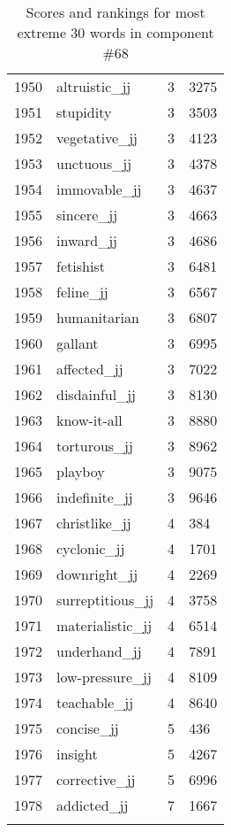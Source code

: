 \begin{longtable}[!htbp]{| rlr@{.}l |}
    1950 & altruistic\_jj & 3 & 3275 \\
    1951 & stupidity & 3 & 3503 \\
    1952 & vegetative\_jj & 3 & 4123 \\
    1953 & unctuous\_jj & 3 & 4378 \\
    1954 & immovable\_jj & 3 & 4637 \\
    1955 & sincere\_jj & 3 & 4663 \\
    1956 & inward\_jj & 3 & 4686 \\
    1957 & fetishist & 3 & 6481 \\
    1958 & feline\_jj & 3 & 6567 \\
    1959 & humanitarian & 3 & 6807 \\
    1960 & gallant & 3 & 6995 \\
    1961 & affected\_jj & 3 & 7022 \\
    1962 & disdainful\_jj & 3 & 8130 \\
    1963 & know-it-all & 3 & 8880 \\
    1964 & torturous\_jj & 3 & 8962 \\
    1965 & playboy & 3 & 9075 \\
    1966 & indefinite\_jj & 3 & 9646 \\
    1967 & christlike\_jj & 4 & 384 \\
    1968 & cyclonic\_jj & 4 & 1701 \\
    1969 & downright\_jj & 4 & 2269 \\
    1970 & surreptitious\_jj & 4 & 3758 \\
    1971 & materialistic\_jj & 4 & 6514 \\
    1972 & underhand\_jj & 4 & 7891 \\
    1973 & low-pressure\_jj & 4 & 8109 \\
    1974 & teachable\_jj & 4 & 8640 \\
    1975 & concise\_jj & 5 & 436 \\
    1976 & insight & 5 & 4267 \\
    1977 & corrective\_jj & 5 & 6996 \\
    1978 & addicted\_jj & 7 & 1667 \\
    \hline
    \caption{Scores and rankings for most extreme 30 words in component \#68} \\
\end{longtable}
